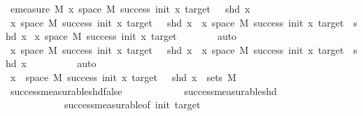 \begin{isabellebody}
{\isacharplus}{\kern0pt}\ emeasure\ M\ {\isacharbraceleft}{\kern0pt}x{\isasymin}\ space\ M{\isachardot}{\kern0pt}\ success\ init\ x\ target\ {\isasymand}\ {\isasymnot}\ {\isacharparenleft}{\kern0pt}shd\ x{\isacharparenright}{\kern0pt}{\isacharbraceright}{\kern0pt}{\isachardoublequoteclose}\isanewline
\ \ \isamarkupfalse%
{\isacharminus}{\kern0pt}\isanewline
\ \ \ \ \isamarkupfalse%
\ {\isachardoublequoteopen}{\isacharbraceleft}{\kern0pt}x{\isasymin}\ space\ M{\isachardot}{\kern0pt}\ success\ init\ x\ target\ {\isasymand}\ {\isasymnot}\ {\isacharparenleft}{\kern0pt}shd\ x{\isacharparenright}{\kern0pt}{\isacharbraceright}{\kern0pt}\ {\isasymunion}\ {\isacharbraceleft}{\kern0pt}x{\isasymin}\ space\ M{\isachardot}{\kern0pt}\ success\ init\ x\ target\ {\isasymand}\ {\isacharparenleft}{\kern0pt}shd\ x{\isacharparenright}{\kern0pt}{\isacharbraceright}{\kern0pt}\ {\isacharequal}{\kern0pt}\isanewline
{\isacharbraceleft}{\kern0pt}x{\isasymin}\ space\ M{\isachardot}{\kern0pt}\ success\ init\ x\ target{\isacharbraceright}{\kern0pt}{\isachardoublequoteclose}\isanewline
\ \ \ \ \ \ \isamarkupfalse%
\ auto\isanewline
\ \ \ \ \isamarkupfalse%
\ \isamarkupfalse%
\ {\isachardoublequoteopen}{\isacharbraceleft}{\kern0pt}x{\isasymin}\ space\ M{\isachardot}{\kern0pt}\ success\ init\ x\ target\ {\isasymand}\ {\isasymnot}\ {\isacharparenleft}{\kern0pt}shd\ x{\isacharparenright}{\kern0pt}{\isacharbraceright}{\kern0pt}\ {\isasyminter}\ {\isacharbraceleft}{\kern0pt}x{\isasymin}\ space\ M{\isachardot}{\kern0pt}\ success\ init\ x\ target\ {\isasymand}\ {\isacharparenleft}{\kern0pt}shd\ x{\isacharparenright}{\kern0pt}{\isacharbraceright}{\kern0pt}\ {\isacharequal}{\kern0pt}\ {\isacharbraceleft}{\kern0pt}{\isacharbraceright}{\kern0pt}{\isachardoublequoteclose}\isanewline
\ \ \ \ \ \ \isamarkupfalse%
\ auto\isanewline
\ \ \ \ \isamarkupfalse%
\ \isamarkupfalse%
\ {\isachardoublequoteopen}{\isacharbraceleft}{\kern0pt}x\ {\isasymin}\ space\ M{\isachardot}{\kern0pt}\ success\ init\ x\ target\ {\isasymand}\ {\isasymnot}\ shd\ x{\isacharbraceright}{\kern0pt}\ {\isasymin}\ sets\ M{\isachardoublequoteclose}\isanewline
\ \ \ \ \ \ \isamarkupfalse%
\ success{\isacharunderscore}{\kern0pt}measurable{\isacharunderscore}{\kern0pt}shd{\isacharunderscore}{\kern0pt}false\isanewline
\ \ \ \ \ \ \ \ \ \ \ \ success{\isacharunderscore}{\kern0pt}measurable{\isacharunderscore}{\kern0pt}shd\isanewline
\ \ \ \ \ \ \ \ \ \ \ \ success{\isacharunderscore}{\kern0pt}measurable{\isacharbrackleft}{\kern0pt}of\ init\ target{\isacharbrackright}{\kern0pt}\isanewline

\end{isabellebody}
